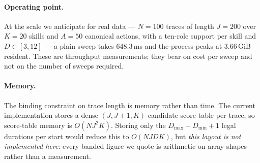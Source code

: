 \paragraph{Operating point.}
At the scale we anticipate for real data --- $N=100$ traces of length $J=200$ over
$K=20$ skills and $A=50$ canonical actions, with a ten-role support per skill and
$D\in[3,12]$ --- a plain sweep takes 648.3\,ms and the process peaks at
3.66\,GiB resident. These are throughput measurements; they bear on cost per
sweep and not on the number of sweeps required.

\paragraph{Memory.}
The binding constraint on trace length is memory rather than time. The current
implementation stores a dense $(J, J{+}1, K)$ candidate score table per trace, so
score-table memory is $O(NJ^2K)$. Storing only the $D_{\max} - D_{\min} + 1$
legal durations per start would reduce this to $O(NJDK)$, but
\emph{this layout is not implemented here}: every banded figure we quote is
arithmetic on array shapes rather than a measurement.
